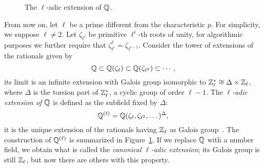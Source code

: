 \documentclass{sig-alternate}
\begin{document}
\begin{figure}
  \centering
  \caption{The $\ell$-adic extension of $\mathbb{Q}$.}
  \label{fig:ladic}
\end{figure}

From now on, let $\ell$ be a prime different from the characteristic
$p$. For simplicity, we suppose $\ell\ne2$. Let $\zeta_{\ell^i}$ be
primitive $\ell^i$-th roots of unity, for algorithmic purposes we
further require that
$\zeta_{\ell^i}^\ell=\zeta_{\ell^{i-1}}$. Consider the tower of
extensions of the rationals given by
\begin{equation*}
  \mathbb{Q} \subset \mathbb{Q}(\zeta_\ell) \subset \mathbb{Q}(\zeta_{\ell^2}) \subset \cdots,
\end{equation*}
its limit is an infinite extension with Galois group isomorphic to
$\mathbb{Z}_\ell^\ast\cong\Delta\times\mathbb{Z}_\ell$, where $\Delta$ is the torsion
part of $\mathbb{Z}_\ell^\ast$, a cyclic group of order $\ell-1$. The
\emph{$\ell$-adic extension of $\mathbb{Q}$} is defined as the subfield fixed
by $\Delta$:
\begin{equation}
  \mathbb{Q}^{(\ell)} = \mathbb{Q}(\zeta_\ell, \zeta_{\ell^2}, \dots)^\Delta,
\end{equation}
it is the unique extension of the rationals having $\mathbb{Z}_\ell$ as Galois
group~\cite{lang1990cyclotomic,washington1997introduction}. The
construction of $\mathbb{Q}^{(\ell)}$ is summarized in
Figure~\ref{fig:ladic}. If we replace $\mathbb{Q}$ with a number field, we
obtain what is called the \emph{canonical $\ell$-adic extension}; its
Galois group is still $\mathbb{Z}_\ell$, but now there are others with this
property.
\end{document}
